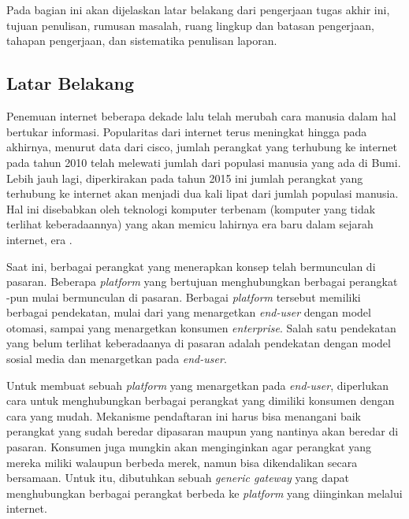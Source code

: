 \chapter{\babSatu}
Pada bagian ini akan dijelaskan latar belakang dari pengerjaan tugas akhir ini, tujuan penulisan, rumusan masalah, ruang lingkup dan batasan pengerjaan, tahapan pengerjaan, dan sistematika penulisan laporan.


\section{Latar Belakang}
Penemuan internet beberapa dekade lalu telah merubah cara manusia dalam hal bertukar informasi. Popularitas dari internet terus meningkat hingga pada akhirnya, menurut data dari cisco\cite{1}, jumlah perangkat yang terhubung ke internet pada tahun 2010 telah melewati jumlah dari populasi manusia yang ada di Bumi. Lebih jauh lagi, diperkirakan pada tahun 2015 ini jumlah perangkat yang terhubung ke internet akan menjadi dua kali lipat dari jumlah populasi manusia. Hal ini disebabkan oleh teknologi komputer terbenam (komputer yang tidak terlihat keberadaannya) yang akan memicu lahirnya era baru dalam sejarah internet, era \iot.

Saat ini, berbagai perangkat yang menerapkan konsep \iot telah bermunculan di pasaran. Beberapa \textit{platform} yang bertujuan menghubungkan berbagai perangkat \iot-pun mulai bermunculan di pasaran. Berbagai \textit{platform} tersebut memiliki berbagai pendekatan, mulai dari yang menargetkan \textit{end-user} dengan model otomasi, sampai yang menargetkan konsumen \textit{enterprise}. Salah satu pendekatan yang belum terlihat keberadaanya di pasaran adalah pendekatan dengan model sosial media dan menargetkan pada \textit{end-user}.

Untuk membuat sebuah \textit{platform} yang menargetkan pada \textit{end-user}, diperlukan cara untuk menghubungkan berbagai perangkat yang dimiliki konsumen dengan cara yang mudah. Mekanisme pendaftaran ini harus bisa menangani baik perangkat yang sudah beredar dipasaran maupun yang nantinya akan beredar di pasaran. Konsumen juga mungkin akan menginginkan agar perangkat yang mereka miliki walaupun berbeda merek, namun bisa dikendalikan secara bersamaan. Untuk itu, dibutuhkan sebuah \textit{generic gateway} yang dapat menghubungkan berbagai perangkat berbeda ke \textit{platform} yang diinginkan melalui internet.

